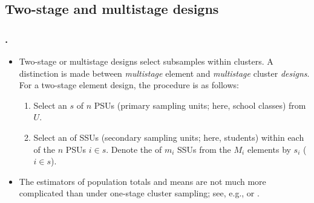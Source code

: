 \documentclass{my_eth_beamer}
\numberwithin{equation}{section}
\begin{document}
\subsection{Two-stage and multistage designs}

\begin{frame}
    \frametitle{\insertsectionnumber.\insertsubsectionnumber~\insertsubsection}
    \begin{itemize}
    \setlength{\itemsep}{1pt}
        \item Two-stage or multistage designs select \alert{subsamples} within
            clusters. A distinction is made between \emph{multistage}
            \alert{element} and \emph{multistage} \alert{cluster}
            \emph{designs}. For a \alert{two-stage element design}, the
            procedure is as follows:
            \vspace{0.25em}
            \begin{enumerate}[1)]
            \setlength{\itemsep}{8pt}
                \item Select an \SRS $s$ of $n$ \alert{PSUs} (primary sampling
                    units; here, school classes) from $U$.
                \item Select an \SRS of \alert{SSUs} (secondary sampling units;
                    here, students) within each of the $n$ PSUs $i\in s$.
                    Denote the \SRS of $m_i$ SSUs from the $M_i$ elements by
                    $s_i$ ($i\in s$).
            \end{enumerate}
        \item The \alert{estimators} of population totals and means are
            \alert{not much more complicated} than under one-stage cluster
            sampling; see, e.g., \citet[][Chapter 3.4]{wu_thompson_2020} or
            \citet[][Chapter 5.3]{lohr_2019}.
    \end{itemize}
\end{frame}
\end{document}
